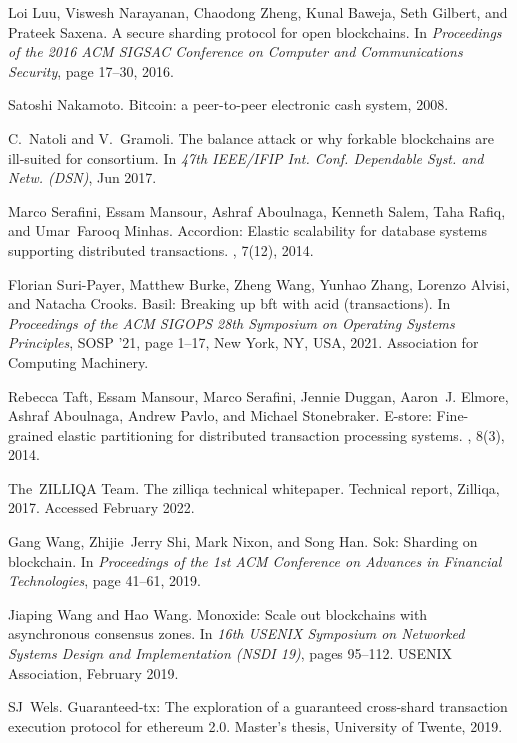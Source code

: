 \documentclass[11pt,dvipdfm]{article}
\begin{document}
\begin{thebibliography}{10}
Loi Luu, Viswesh Narayanan, Chaodong Zheng, Kunal Baweja, Seth Gilbert, and
  Prateek Saxena.
\newblock A secure sharding protocol for open blockchains.
\newblock In {\em Proceedings of the 2016 ACM SIGSAC Conference on Computer and
  Communications Security}, page 17–30, 2016.

Satoshi Nakamoto.
\newblock Bitcoin: a peer-to-peer electronic cash system, 2008.

C.~Natoli and V.~Gramoli.
\newblock The balance attack or why forkable blockchains are ill-suited for
  consortium.
\newblock In {\em 47th {IEEE/IFIP} Int. Conf. Dependable Syst. and Netw.
  (DSN)}, Jun 2017.

Marco Serafini, Essam Mansour, Ashraf Aboulnaga, Kenneth Salem, Taha Rafiq, and
  Umar~Farooq Minhas.
\newblock Accordion: Elastic scalability for database systems supporting
  distributed transactions.
, 7(12), 2014.

Florian Suri-Payer, Matthew Burke, Zheng Wang, Yunhao Zhang, Lorenzo Alvisi,
  and Natacha Crooks.
\newblock Basil: Breaking up bft with acid (transactions).
\newblock In {\em Proceedings of the ACM SIGOPS 28th Symposium on Operating
  Systems Principles}, SOSP '21, page 1–17, New York, NY, USA, 2021.
  Association for Computing Machinery.

Rebecca Taft, Essam Mansour, Marco Serafini, Jennie Duggan, Aaron~J. Elmore,
  Ashraf Aboulnaga, Andrew Pavlo, and Michael Stonebraker.
\newblock E-store: Fine-grained elastic partitioning for distributed
  transaction processing systems.
, 8(3), 2014.

The~ZILLIQA Team.
\newblock The zilliqa technical whitepaper.
\newblock Technical report, Zilliqa, 2017.
\newblock Accessed February 2022.

Gang Wang, Zhijie~Jerry Shi, Mark Nixon, and Song Han.
\newblock Sok: Sharding on blockchain.
\newblock In {\em Proceedings of the 1st ACM Conference on Advances in
  Financial Technologies}, page 41–61, 2019.

Jiaping Wang and Hao Wang.
\newblock Monoxide: Scale out blockchains with asynchronous consensus zones.
\newblock In {\em 16th USENIX Symposium on Networked Systems Design and
  Implementation (NSDI 19)}, pages 95--112. USENIX Association, February 2019.

SJ~Wels.
\newblock Guaranteed-tx: The exploration of a guaranteed cross-shard
  transaction execution protocol for ethereum 2.0.
\newblock Master's thesis, University of Twente, 2019.


\end{thebibliography}
\end{document}
